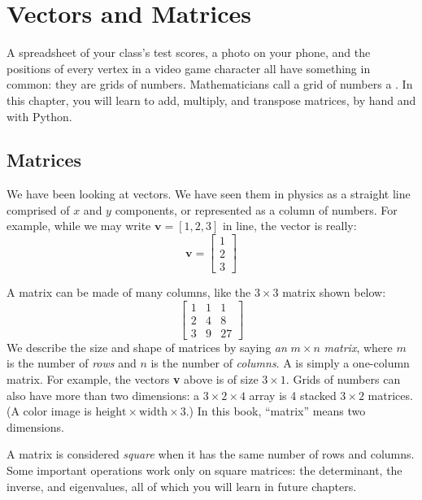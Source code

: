 \chapter{Vectors and Matrices}

A spreadsheet of your class's test scores, a photo on your phone, and the
positions of every vertex in a video game character all have something in
common: they are grids of numbers. Mathematicians call a grid of numbers a
. In this chapter, you will learn to add, multiply, and
transpose matrices, by hand and with Python.
\section{Matrices}
We have been looking at vectors. We have seen them in physics as a straight line comprised of $x$ and $y$ components, or represented as a column of
numbers. For example, while we may write $\mathbf{v} = \left[ 1, 2, 3 \right]$
in line, the vector is really:
$$\mathbf{v} = \begin{bmatrix}
1\\
2\\
3
\end{bmatrix}$$

A matrix can be made of many columns, like the $3 \times 3$ matrix shown below:
$$\begin{bmatrix}
1 & 1 & 1\\
2 & 4 & 8\\
3 & 9 & 27
\end{bmatrix}$$
We describe the size and shape of matrices by saying \textit{an }$m \times
n$\textit{ matrix}, where $m$ is the number of \emph{rows} and $n$ is the number of
\emph{columns}. A  is simply a one-column matrix. For example, the vectors
\textbf{v} above is of size $3 \times 1$. Grids of numbers can also have
more than two dimensions: a $3 \times 2 \times 4$ array is 4 stacked $3
\times 2$ matrices. (A color image is $\text{height} \times \text{width}
\times 3$.) In this book, ``matrix'' means two dimensions.

A matrix is considered \emph{square} when it has the same number of rows and columns. Some important operations work only on square matrices: the determinant,
the inverse, and eigenvalues, all of which you will learn in future chapters.

